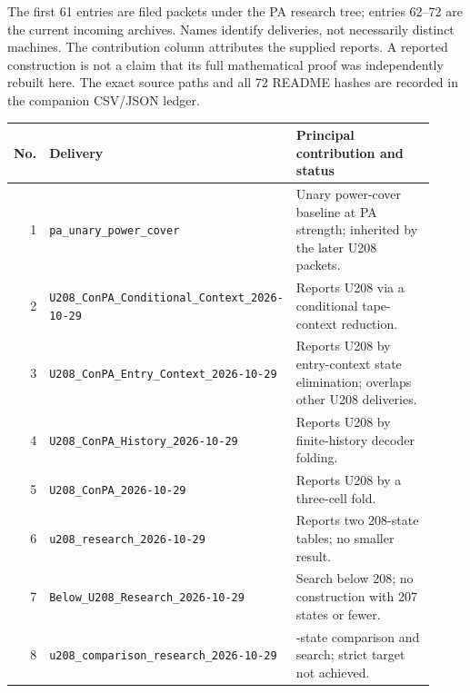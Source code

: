 The first 61 entries are filed packets under the PA research tree; entries 62--72 are the current incoming archives. Names identify deliveries, not necessarily distinct machines. The contribution column attributes the supplied reports. A reported construction is not a claim that its full mathematical proof was independently rebuilt here. The exact source paths and all 72 README hashes are recorded in the companion CSV/JSON ledger.

{\footnotesize
\setlength{\tabcolsep}{3pt}
\renewcommand{\arraystretch}{1.08}
\begin{longtable}{@{}r >{\raggedright\arraybackslash}p{0.36\linewidth} >{\raggedright\arraybackslash}p{0.56\linewidth}@{}}
\toprule No. & Delivery & Principal contribution and status\\\midrule\endhead
1 & \texttt{pa\_\allowbreak{}unary\_\allowbreak{}power\_\allowbreak{}cover} & Unary power-cover baseline at PA strength; inherited by the later U208 packets.\\[3pt]
2 & \texttt{U208\_\allowbreak{}ConPA\_\allowbreak{}Conditional\_\allowbreak{}Context\_\allowbreak{}2026-\allowbreak{}10-\allowbreak{}29} & Reports U208 via a conditional tape-context reduction.\\[3pt]
3 & \texttt{U208\_\allowbreak{}ConPA\_\allowbreak{}Entry\_\allowbreak{}Context\_\allowbreak{}2026-\allowbreak{}10-\allowbreak{}29} & Reports U208 by entry-context state elimination; overlaps other U208 deliveries.\\[3pt]
4 & \texttt{U208\_\allowbreak{}ConPA\_\allowbreak{}History\_\allowbreak{}2026-\allowbreak{}10-\allowbreak{}29} & Reports U208 by finite-history decoder folding.\\[3pt]
5 & \texttt{U208\_\allowbreak{}ConPA\_\allowbreak{}2026-\allowbreak{}10-\allowbreak{}29} & Reports U208 by a three-cell fold.\\[3pt]
6 & \texttt{u208\_\allowbreak{}research\_\allowbreak{}2026-\allowbreak{}10-\allowbreak{}29} & Reports two 208-state tables; no smaller result.\\[3pt]
7 & \texttt{Below\_\allowbreak{}U208\_\allowbreak{}Research\_\allowbreak{}2026-\allowbreak{}10-\allowbreak{}29} & Search below 208; no construction with 207 states or fewer.\\[3pt]
8 & \texttt{u208\_\allowbreak{}comparison\_\allowbreak{}research\_\allowbreak{}2026-\allowbreak{}10-\allowbreak{}29} & 208-state comparison and search; strict target not achieved.\\[3pt]

\end{longtable}}
